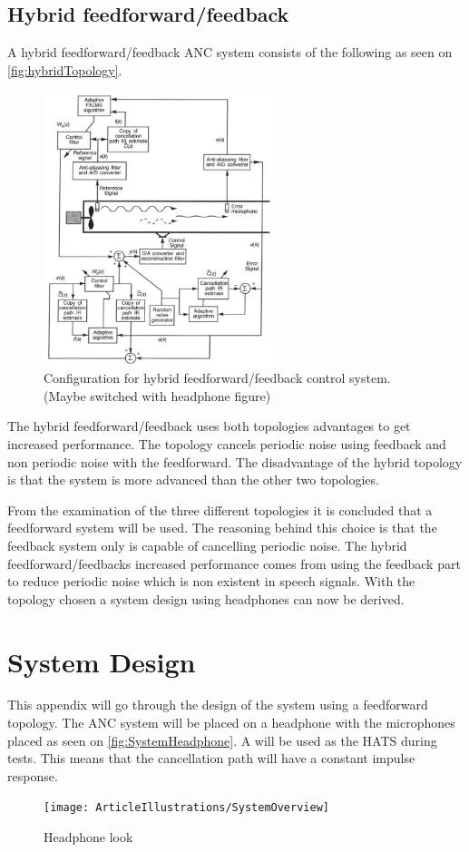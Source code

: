 \subsection*{Hybrid feedforward/feedback}    
A hybrid feedforward/feedback ANC system consists of the following as seen on \autoref{fig:hybridTopology}.
\begin{figure}[H]
	\centering
	\includegraphics[width=0.6\textwidth]{figures/BasicSystem/hybrid}
	\caption{Configuration for hybrid feedforward/feedback control system. (Maybe switched with headphone figure)}
	\label{fig:hybridTopology}
\end{figure}

The hybrid feedforward/feedback uses both topologies advantages to get increased performance. The topology cancels periodic noise using feedback and non periodic noise with the feedforward. The disadvantage of the hybrid topology is that the system is more advanced than the other two topologies.   

From the examination of the three different topologies it is concluded that a feedforward system will be used. The reasoning behind this choice is that the feedback system only is capable of cancelling periodic noise. The hybrid feedforward/feedbacks increased performance comes from using the feedback part to reduce periodic noise which is non existent in speech signals. With the topology chosen a system design using headphones can now be derived. 



\newpage 
\section{System Design} \label{sec:systemDesign}
This appendix will go through the design of the system using a feedforward topology. The ANC system will be placed on a headphone with the microphones placed as seen on \autoref{fig:SystemHeadphone}. A  will be used as the HATS during tests. This means that the cancellation path will have a constant impulse response. 
\begin{figure}[H]
	\centering
	\texttt{[image: ArticleIllustrations/SystemOverview]}
	\caption{Headphone look}
	\label{fig:SystemHeadphone}
\end{figure}  

